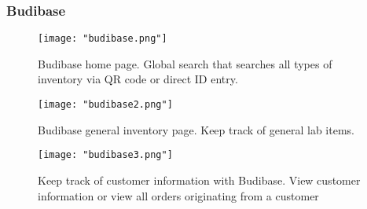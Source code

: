\documentclass{article}
\begin{document}
\subsubsection{Budibase}
\begin{figure}[h!]
    \centering
    \texttt{[image: "budibase.png"]}
    \caption{Budibase home page. Global search that searches all types of inventory via QR code or direct ID entry.}
    \label{fig:budibase_home}
\end{figure}
\begin{figure}[h!]
    \centering
    \texttt{[image: "budibase2.png"]}
    \caption{Budibase general inventory page. Keep track of general lab items.}
    \label{fig:budibase_gen_inv}
\end{figure}
\begin{figure}[h!]
    \centering
    \texttt{[image: "budibase3.png"]}
    \caption{Keep track of customer information with Budibase. View customer information or view all orders originating from a
    customer}
    \label{fig:budibase_customers}
\end{figure}

\FloatBarrier
\end{document}
